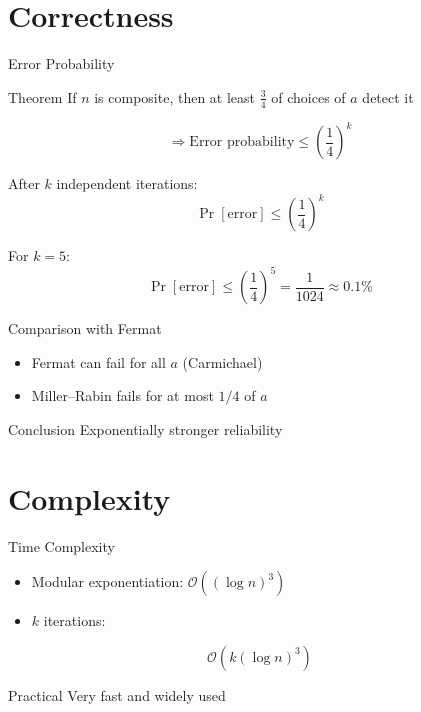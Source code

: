 \documentclass{beamer}
\newcommand{\bigO}{\mathcal{O}}
\begin{document}
\section{Correctness}

\begin{frame}{Error Probability}

\begin{block}{Theorem}
If $n$ is composite, then at least $\frac{3}{4}$ of choices of $a$ detect it
\end{block}

\vspace{1em}

\[
\Rightarrow \text{Error probability} \le \left(\frac{1}{4}\right)^k
\]

After $k$ independent iterations:
\[
\Pr[\text{error}] \le \left(\frac{1}{4}\right)^k
\]

\vspace{0.5em}

For $k = 5$:
\[
\Pr[\text{error}] \le \left(\frac{1}{4}\right)^5 = \frac{1}{1024} \approx 0.1\%
\]
\end{frame}


\begin{frame}{Comparison with Fermat}

\begin{itemize}
    \item Fermat can fail for all $a$ (Carmichael)
    \item Miller--Rabin fails for at most $1/4$ of $a$
\end{itemize}

\vspace{1em}

\begin{block}{Conclusion}
Exponentially stronger reliability
\end{block}

\end{frame}

\section{Complexity}

\begin{frame}{Time Complexity}

\begin{itemize}
    \item Modular exponentiation: $\bigO((\log n)^3)$
    \item $k$ iterations:
\end{itemize}

\[
\bigO(k (\log n)^3)
\]

\vspace{1em}

\begin{block}{Practical}
Very fast and widely used
\end{block}

\end{frame}
\end{document}
